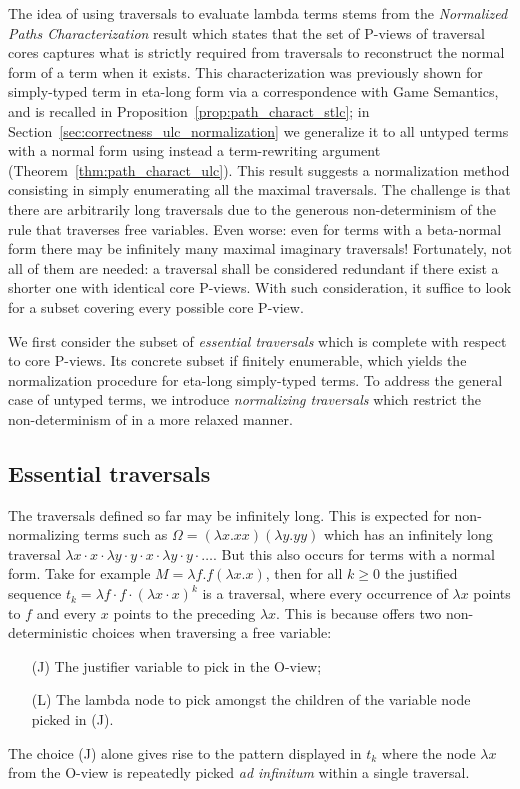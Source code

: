 \documentclass{elsarticle}
\theoremstyle{plain}
\theoremstyle{definition}
\begin{document}
The idea of using traversals to evaluate lambda terms stems from the \emph{Normalized Paths Characterization} result which states that the set of P-views of traversal cores captures what is strictly required from traversals to reconstruct the normal form of a term when it exists.
This characterization was previously shown for simply-typed term in eta-long form via
a correspondence with Game Semantics,
 and is recalled in Proposition~\ref{prop:path_charact_stlc};
 in Section~\ref{sec:correctness_ulc_normalization} we generalize it to all untyped terms with a normal form using instead a term-rewriting argument (Theorem~\ref{thm:path_charact_ulc}).
This result suggests a normalization method consisting in simply enumerating all the maximal traversals.
The challenge is that there are arbitrarily long traversals due to the generous non-determinism of the rule  that traverses free variables.
Even worse: even for terms with a beta-normal form
there may be infinitely many maximal imaginary traversals!
Fortunately, not all of them are needed: a traversal shall be considered redundant if there exist a shorter one with identical core P-views.
With such consideration, it suffice to look for a subset covering every possible core P-view.

We first consider the subset of \emph{essential traversals} which is complete with respect to core P-views.
Its concrete subset if finitely enumerable, which yields the normalization procedure for eta-long simply-typed terms.
To address the general case of untyped terms,
we introduce \emph{normalizing traversals} which restrict the non-determinism of  in a more relaxed manner.

\subsection{Essential traversals}

The traversals defined so far may be infinitely long. This is expected for non-normalizing terms such as $\Omega = (\lambda x. x x)(\lambda y. y y)$ which has an infinitely long traversal $\lambda x \cdot x \cdot \lambda y \cdot y \cdot x \cdot \lambda y \cdot y \cdot \ldots$. But this also occurs for terms with a normal form. Take for example $M = \lambda f . f (\lambda x. x)$, then for all $k\geq0$ the justified sequence $t_k = \lambda f \cdot f \cdot (\lambda x \cdot  x)^k$ is a traversal, where every occurrence of $\lambda x$ points to $f$ and every $x$ points to the preceding $\lambda x$.
This is because  offers two non-deterministic choices when traversing a free variable:
\begin{itemize}
\item[(J)] The justifier variable to pick in the O-view;
\item[(L)] The lambda node to pick amongst the children of the variable node picked in (J).
\end{itemize}
The choice (J) alone gives rise to the pattern displayed in $t_k$ where the node $\lambda x$ from the O-view is repeatedly picked {\it ad infinitum} within a single traversal.
\end{document}
